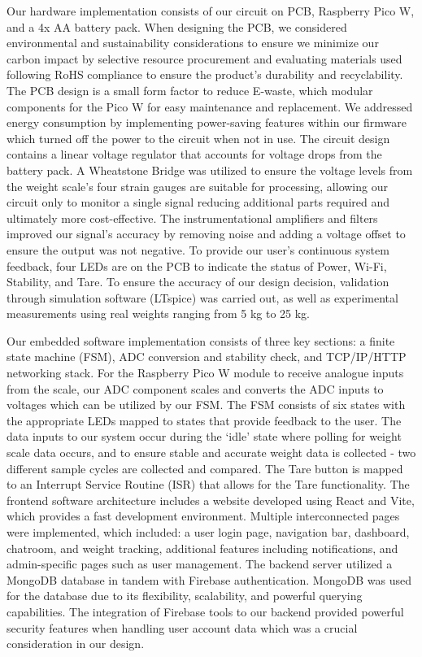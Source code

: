 Our hardware implementation consists of our circuit on PCB, Raspberry Pico W, and a 4x AA battery pack. When designing the PCB, we considered environmental and sustainability considerations to ensure we minimize our carbon impact by selective resource procurement and evaluating materials used following RoHS compliance to ensure the product's durability and recyclability. The PCB design is a small form factor to reduce E-waste, which modular components for the Pico W for easy maintenance and replacement. We addressed energy consumption by implementing power-saving features within our firmware which turned off the power to the circuit when not in use. The circuit design contains a linear voltage regulator that accounts for voltage drops from the battery pack. A Wheatstone Bridge was utilized to ensure the voltage levels from the weight scale’s four strain gauges are suitable for processing, allowing our circuit only to monitor a single signal reducing additional parts required and ultimately more cost-effective. The instrumentational amplifiers and filters improved our signal's accuracy by removing noise and adding a voltage offset to ensure the output was not negative. To provide our user’s continuous system feedback, four LEDs are on the PCB to indicate the status of Power, Wi-Fi, Stability, and Tare. To ensure the accuracy of our design decision, validation through simulation software (LTspice) was carried out, as well as experimental measurements using real weights ranging from 5 kg to 25 kg.

Our embedded software implementation consists of three key sections: a finite state machine (FSM), ADC conversion and stability check, and TCP/IP/HTTP networking stack. For the Raspberry Pico W module to receive analogue inputs from the scale, our ADC component scales and converts the ADC inputs to voltages which can be utilized by our FSM. The FSM consists of six states with the appropriate LEDs mapped to states that provide feedback to the user. The data inputs to our system occur during the ‘idle’ state where polling for weight scale data occurs, and to ensure stable and accurate weight data is collected - two different sample cycles are collected and compared. The Tare button is mapped to an Interrupt Service Routine (ISR) that allows for the Tare functionality. The frontend software architecture includes a website developed using React and Vite, which provides a fast development environment. Multiple interconnected pages were implemented, which included: a user login page, navigation bar, dashboard, chatroom, and weight tracking, additional features including notifications, and admin-specific pages such as user management. The backend server utilized a MongoDB database in tandem with Firebase authentication. MongoDB was used for the database due to its flexibility, scalability, and powerful querying capabilities. The integration of Firebase tools to our backend provided powerful security features when handling user account data which was a crucial consideration in our design.

